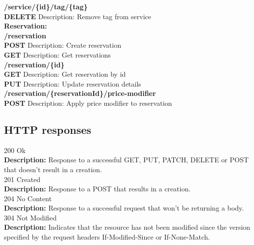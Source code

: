 \documentclass[11pt,a4paper,pdftex]{article}
\begin{document}
\hspace*{1em}\textbf{/service/\{\textbf{id}\}/tag/\{\textbf{tag}\}}\\
\hspace*{2em}\textbf{DELETE} Description: Remove tag from service\\



\textbf{Reservation:}\\
\hspace*{1em}\textbf{/reservation}\\
\hspace*{2em}\textbf{POST} Description: Create reservation\\
\hspace*{2em}\textbf{GET} Description: Get reservations\\

\hspace*{1em}\textbf{/reservation/\{\textbf{id}\}}\\
\hspace*{2em}\textbf{GET} Description: Get reservation by id\\
\hspace*{2em}\textbf{PUT} Description: Update reservation details\\

\hspace*{1em}\textbf{/reservation/\{\textbf{reservationId}\}/price-modifier}\\
\hspace*{2em}\textbf{POST} Description: Apply price modifier to reservation\\




\subsection{HTTP responses}
\hspace*{1em}200 Ok\\
\hspace*{2em}\textbf{Description:} Response to a successful GET, PUT, PATCH, DELETE or POST that doesn't result in a creation.\\
\hspace*{1em}201 Created\\
\hspace*{2em}\textbf{Description:} Response to a POST that results in a creation.\\
\hspace*{1em}204 No Content\\
\hspace*{2em}\textbf{Description:} Response to a successful request that won't be returning a body.\\
\hspace*{1em}304 Not Modified\\
\hspace*{2em}\textbf{Description:} Indicates that the resource has not been modified since the version specified by the request headers If-Modified-Since or If-None-Match.
\end{document}
